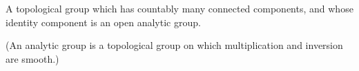 A topological group which has countably many connected 
components, and whose identity component is an open
analytic group.
\par
(An analytic group is a topological group on which
multiplication and inversion are smooth.)